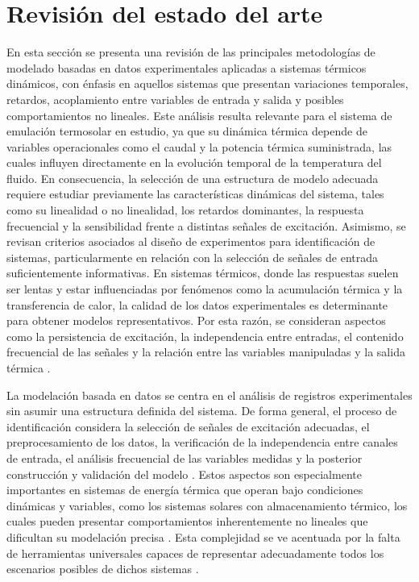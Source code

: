 \documentclass[11pt]{report}
\begin{document}
\chapter{Revisión del estado del arte} 

En esta sección se presenta una revisión de las principales metodologías de modelado basadas en datos experimentales aplicadas a sistemas térmicos dinámicos, con énfasis en aquellos sistemas que presentan variaciones temporales, retardos, acoplamiento entre variables de entrada y salida y posibles comportamientos no lineales. Este análisis resulta relevante para el sistema de emulación termosolar en estudio, ya que su dinámica térmica depende de variables operacionales como el caudal y la potencia térmica suministrada, las cuales influyen directamente en la evolución temporal de la temperatura del fluido. En consecuencia, la selección de una estructura de modelo adecuada requiere estudiar previamente las características dinámicas del sistema, tales como su linealidad o no linealidad, los retardos dominantes, la respuesta frecuencial y la sensibilidad frente a distintas señales de excitación.
Asimismo, se revisan criterios asociados al diseño de experimentos para identificación de sistemas, particularmente en relación con la selección de señales de entrada suficientemente informativas. En sistemas térmicos, donde las respuestas suelen ser lentas y estar influenciadas por fenómenos como la acumulación térmica y la transferencia de calor, la calidad de los datos experimentales es determinante para obtener modelos representativos. Por esta razón, se consideran aspectos como la persistencia de excitación, la independencia entre entradas, el contenido frecuencial de las señales y la relación entre las variables manipuladas y la salida térmica \cite{csurcsia2020user}.


La modelación basada en datos se centra en el análisis de registros experimentales sin asumir una estructura definida del sistema. De forma general, el proceso de identificación considera la selección de señales de excitación adecuadas, el preprocesamiento de los datos, la verificación de la independencia entre canales de entrada, el análisis frecuencial de las variables medidas y la posterior construcción y validación del modelo \cite{csurcsia2020user}. Estos aspectos son especialmente importantes en sistemas de energía térmica que operan bajo condiciones dinámicas y variables, como los sistemas solares con almacenamiento térmico, los cuales pueden presentar comportamientos inherentemente no lineales que dificultan su modelación precisa \cite{osorio2022forecasting}. Esta complejidad se ve acentuada por la falta de herramientas universales capaces de representar adecuadamente todos los escenarios posibles de dichos sistemas \cite{csurcsia2020user}.
\end{document}
